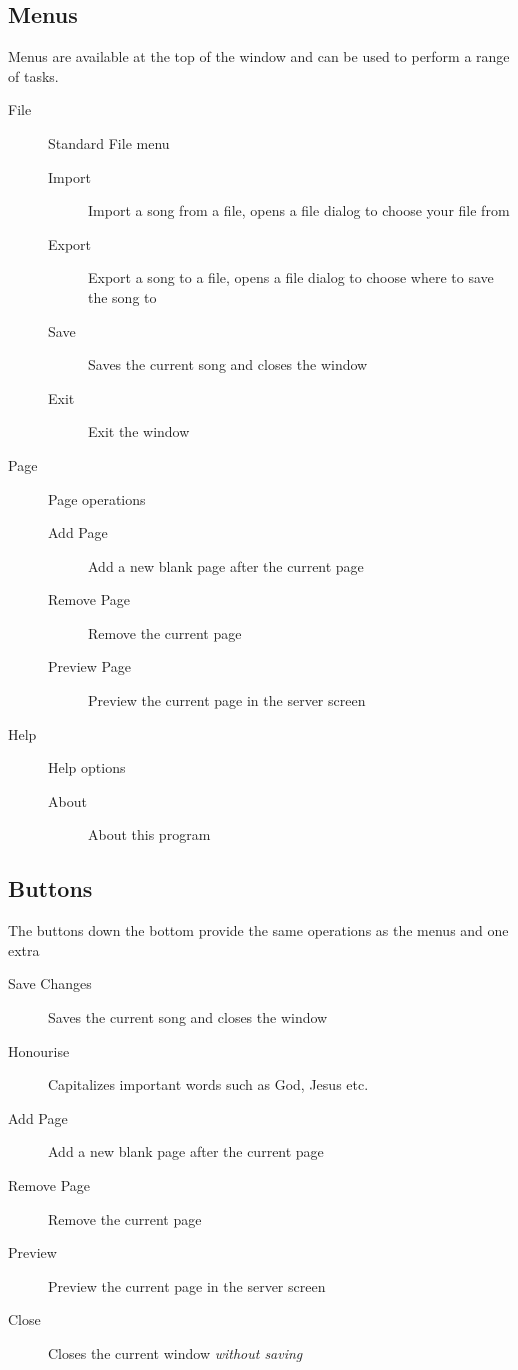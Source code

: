 \documentclass[11pt,twoside]{book}
\begin{document}
\subsection{Menus}
	Menus are available at the top of the window and can be used to perform a range of tasks.
	\begin{description}
		\item[File]
		Standard File menu
		\begin{description}
			\item[Import] Import a song from a file, opens a file dialog to choose your file from
			\item[Export] Export a song to a file, opens a file dialog to choose where to save the song to
			\item[Save] Saves the current song and closes the window
			\item[Exit] Exit the window
		\end{description}
		\item[Page]
		Page operations
		\begin{description}
			\item[Add Page] Add a new blank page after the current page
			\item[Remove Page] Remove the current page
			\item[Preview Page] Preview the current page in the server screen
		\end{description}
		\item[Help]
		Help options
		\begin{description}
			\item[About] About this program
		\end{description}
	\end{description}

\subsection{Buttons}
	The buttons down the bottom provide the same operations as the menus and one extra
	\begin{description}
		\item[Save Changes] Saves the current song and closes the window
		\item[Honourise] Capitalizes important words such as God, Jesus etc.
		\item[Add Page] Add a new blank page after the current page
		\item[Remove Page] Remove the current page
		\item[Preview] Preview the current page in the server screen
		\item[Close] Closes the current window \emph{without saving}
	\end{description}
\end{document}
